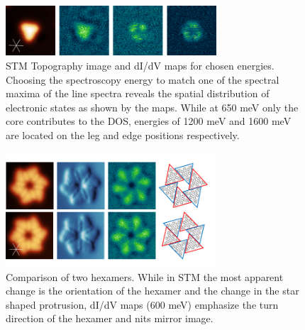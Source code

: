\begin{figure}[] \centering
	\includegraphics[width=0.7\textwidth]{./images/hbbnc-maps}
	\caption{STM Topography image and dI/dV maps for chosen energies. Choosing the spectroscopy energy to match one of the spectral maxima of the line spectra reveals the spatial distribution of electronic states as shown by the maps. While at 650 meV only the core contributes to the DOS, energies of 1200 meV and 1600 meV are located on the leg and edge positions respectively.}
	\label{fig:HBBNC-Ag111-dIdV-maps}
\end{figure}

\begin{figure}[] \centering
	\includegraphics[width=0.7\textwidth]{./images/hbbnc-maps2}
	\caption{Comparison of two hexamers. While in STM the most apparent change is the orientation of the hexamer and the change in the star shaped protrusion, dI/dV maps (600 meV) emphasize the turn direction of the hexamer and nits mirror image.}
	\label{}
\end{figure}

